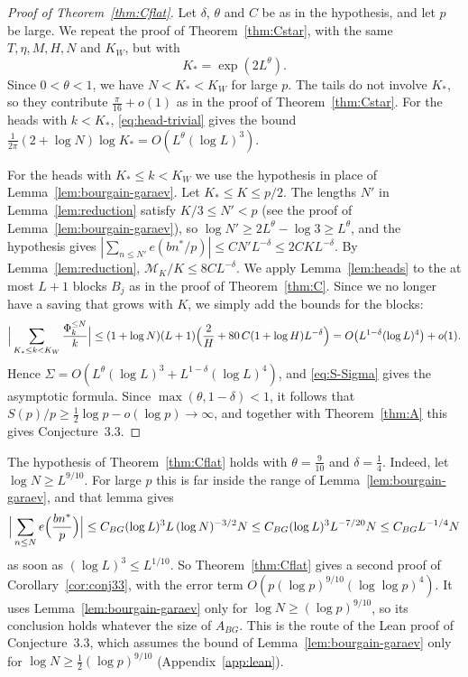 \begin{proof}[Proof of Theorem~\ref{thm:Cflat}]
Let $\delta$, $\theta$ and $C$ be as in the hypothesis, and let $p$ be large. We repeat the proof of
Theorem~\ref{thm:Cstar}, with the same $T,\eta,M,H,N$ and $K_W$, but with
\[
K_*=\exp(2L^\theta).
\]
Since $0<\theta<1$, we have $N<K_*<K_W$ for large $p$. The tails do not involve $K_*$, so they contribute
$\frac\pi{16}+o(1)$ as in the proof of Theorem~\ref{thm:Cstar}. For the heads with $k<K_*$, \eqref{eq:head-trivial}
gives the bound $\frac1{2\pi}(2+\log N)\log K_*=O(L^\theta(\log L)^3)$.

For the heads with $K_*\le k<K_W$ we use the hypothesis in place of Lemma~\ref{lem:bourgain-garaev}. Let
$K_*\le K\le p/2$. The lengths $N'$ in Lemma~\ref{lem:reduction} satisfy $K/3\le N'<p$ (see the proof of
Lemma~\ref{lem:bourgain-garaev}), so $\log N'\ge2L^\theta-\log3\ge L^\theta$, and the hypothesis gives
$|\sum_{n\le N'}e(bn^*/p)|\le CN'L^{-\delta}\le2CKL^{-\delta}$. By Lemma~\ref{lem:reduction},
$\mathcal{M}_K/K\le8CL^{-\delta}$. We apply Lemma~\ref{lem:heads} to the at most $L+1$ blocks $B_j$ as in the proof of
Theorem~\ref{thm:C}. Since we no longer have a saving that grows with $K$, we simply add the bounds for the blocks:
\[
\Big|\sum_{K_*\le k<K_W}\frac{\Phi_k^{\le N}}k\Big|\le(1+\log N)(L+1)\Bigl(\frac2H+80\,C(1+\log H)L^{-\delta}\Bigr)
=O\bigl(L^{1-\delta}(\log L)^4\bigr)+o(1).
\]
Hence $\Sigma=O(L^\theta(\log L)^3+L^{1-\delta}(\log L)^4)$, and \eqref{eq:S-Sigma} gives the asymptotic formula. Since
$\max(\theta,1-\delta)<1$, it follows that $S(p)/p\ge\frac12\log p-o(\log p)\to\infty$, and together with
Theorem~\ref{thm:A} this gives Conjecture~3.3.
\end{proof}

The hypothesis of Theorem~\ref{thm:Cflat} holds with $\theta=\frac9{10}$ and $\delta=\frac14$. Indeed, let
$\log N\ge L^{9/10}$. For large $p$ this is far inside the range of Lemma~\ref{lem:bourgain-garaev}, and that lemma
gives
\[
\Big|\sum_{n\le N}e\Bigl(\frac{bn^*}p\Bigr)\Big|\le C_{BG}(\log L)^3L\,(\log N)^{-3/2}N\le
C_{BG}(\log L)^3L^{-7/20}N\le C_{BG}L^{-1/4}N
\]
as soon as $(\log L)^3\le L^{1/10}$. So Theorem~\ref{thm:Cflat} gives a second proof of Corollary~\ref{cor:conj33},
with the error term $O(p(\log p)^{9/10}(\log\log p)^4)$. It uses Lemma~\ref{lem:bourgain-garaev} only for
$\log N\ge(\log p)^{9/10}$, so its conclusion holds whatever the size of $A_{BG}$. This is the route of the Lean
proof of Conjecture~3.3, which assumes the bound of Lemma~\ref{lem:bourgain-garaev} only for
$\log N\ge\frac12(\log p)^{9/10}$ (Appendix~\ref{app:lean}).

